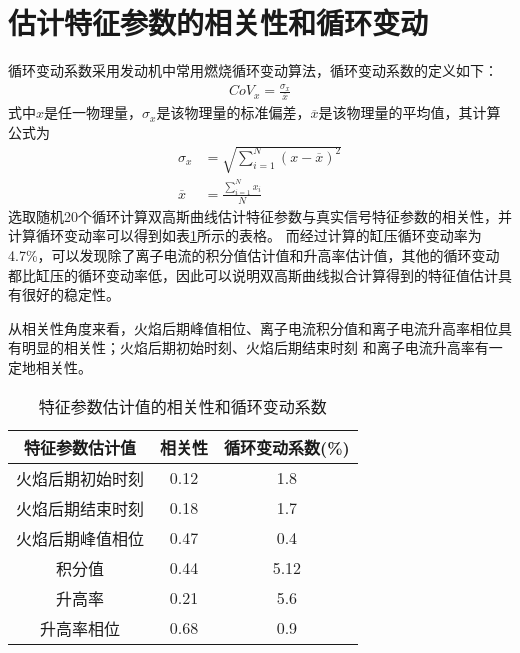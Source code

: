 \section{估计特征参数的相关性和循环变动}
循环变动系数\cite{xhbd}采用发动机中常用燃烧循环变动算法，循环变动系数的定义如下：
\begin{align}
	CoV_x = \frac{\sigma_x}{\overline{x}}
\end{align}
式中$x$是任一物理量，$\sigma_x$是该物理量的标准偏差，$\overline{x}$是该物理量的平均值，其计算公式为
\begin{align}
	\sigma_x &= \sqrt{\sum_{i=1}^{N}(x-\overline{x})^2}\\
	\overline{x} &= \frac{\sum_{i=1}^{N}x_i}{N}
\end{align}
选取随机20个循环计算双高斯曲线估计特征参数与真实信号特征参数的相关性，并计算循环变动率可以得到如表\ref{tab:parainfo}所示的表格。
而经过计算的缸压循环变动率为4.7\%，可以发现除了离子电流的积分值估计值和升高率估计值，其他的循环变动
都比缸压的循环变动率低，因此可以说明双高斯曲线拟合计算得到的特征值估计具有很好的稳定性\cite{ljw2005}。\par
从相关性角度来看，火焰后期峰值相位、离子电流积分值和离子电流升高率相位具有明显的相关性；火焰后期初始时刻、火焰后期结束时刻
和离子电流升高率有一定地相关性\cite{joyce2006linear}。
\begin{table}[H]
	\centering
	\caption{\label{tab:parainfo}特征参数估计值的相关性和循环变动系数}
	\begin{tabular}{ccc}
		\toprule[1.5pt]
		特征参数估计值&相关性&循环变动系数(\%)\\
		\midrule[1pt]
		火焰后期初始时刻&0.12&1.8\\
		火焰后期结束时刻&0.18&1.7\\
		火焰后期峰值相位&0.47&0.4\\
		积分值&0.44&5.12\\
		升高率&0.21&5.6\\
		升高率相位&0.68&0.9\\
		\bottomrule[1.5pt]
	\end{tabular}
\end{table}

